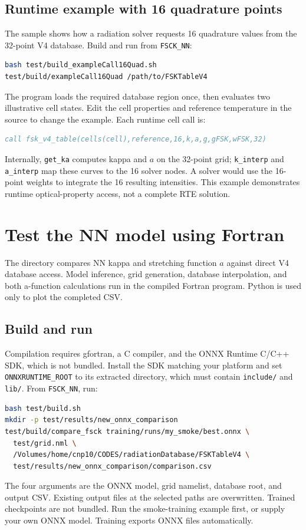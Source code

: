 \documentclass[11pt,letterpaper]{article}
\begin{document}
\subsection{Runtime example with 16 quadrature points}
The sample  shows how a radiation solver
requests 16 quadrature values from the 32-point V4 database. Build and run
from \texttt{FSCK\_NN}:
\begin{lstlisting}[language=bash]
bash test/build_exampleCall16Quad.sh
test/build/exampleCall16Quad /path/to/FSKTableV4
\end{lstlisting}
The program loads the required database region once, then evaluates two
illustrative cell states. Edit the cell properties and reference temperature
in the source to change the example. Each runtime cell call is:
\begin{lstlisting}[language=Fortran]
call fsk_v4_table(cells(cell),reference,16,k,a,g,gFSK,wFSK,32)
\end{lstlisting}
Internally, \texttt{get\_ka} computes kappa and $a$ on the 32-point grid;
\texttt{k\_interp} and \texttt{a\_interp} map these curves to the 16 solver
nodes. A solver would use the 16-point weights to integrate the 16 resulting
intensities. This example demonstrates runtime optical-property access,
not a complete RTE solution. 

\section{Test the NN model using Fortran}
The  directory compares NN kappa and stretching function $a$
against direct V4 database access. Model inference, grid generation, database
interpolation, and both a-function calculations run in the compiled Fortran
program. Python is used only to plot the completed CSV.

\subsection{Build and run}
Compilation requires gfortran, a C compiler, and the ONNX Runtime C/C++
SDK, which is not bundled. Install the SDK matching your platform and set \texttt{ONNXRUNTIME\_ROOT} to its extracted directory,
which must contain \texttt{include/} and \texttt{lib/}. From
\texttt{FSCK\_NN}, run:
\begin{lstlisting}[language=bash]
bash test/build.sh
mkdir -p test/results/new_onnx_comparison
test/build/compare_fsck training/runs/my_smoke/best.onnx \
  test/grid.nml \
  /Volumes/home/cnp10/CODES/radiationDatabase/FSKTableV4 \
  test/results/new_onnx_comparison/comparison.csv
\end{lstlisting}
The four arguments are the ONNX model, grid namelist, database root, and
output CSV. Existing output files at the selected paths are overwritten.
Trained checkpoints are not bundled. Run the smoke-training example first,
or supply your own ONNX model. Training exports ONNX files automatically.
\end{document}
